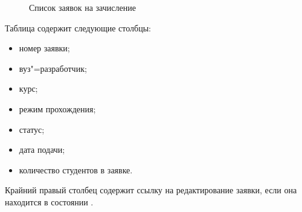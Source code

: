 \begin{figure}[H]
	\caption{Список заявок на зачисление}
	\label{img:student:enroll_req_list}
\end{figure}

Таблица содержит следующие столбцы:
\begin{itemize}
	\item номер заявки;
	\item вуз"=разработчик;
	\item курс;
	\item режим прохождения;
	\item статус;
	\item дата подачи;
	\item количество студентов в заявке.
\end{itemize}

Крайний правый столбец содержит ссылку на редактирование заявки, если она находится в состоянии .

